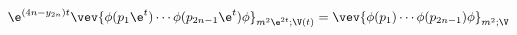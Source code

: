 \begin{equation}
\e^{(4n - y_{2n})t} \vev{ \phi (p_1 \e^t) \cdots \phi (p_{2n-1}
\e^t) \phi }_{m^2 \e^{2t}; \V(t)} = \vev{ \phi (p_1) \cdots
\phi (p_{2n-1}) \phi}_{m^2; \V}
\end{equation}

